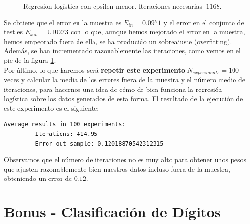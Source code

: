 \documentclass[12pt]{article}
\begin{document}
{\begin{figure}[H]
  \centering
  \qquad
  \caption{Regresión logística con epsilon menor. Iteraciones necesarias: $1168$. }
  \label{fig:myfig:3}
\end{figure}
Se obtiene que el error en la muestra es $E_{in} = 0.0971$ y el error en el conjunto de test es $E_{out} = 0.10273$ con lo que, aunque hemos mejorado el error en la muestra, hemos empeorado fuera de ella, se ha producido un sobreajuste (overfitting). Además, se han incrementado razonablemente las iteraciones, como vemos en el pie de la figura \ref{fig:myfig:3}.\\

Por último, lo que haremos será \textbf{repetir este experimento} $N_{experiments} = 100$ veces y calcular la media de los errores fuera de la muestra y el número medio de iteraciones, para hacernos una idea de cómo de bien funciona la regresión logística sobre los datos generados de esta forma. El resultado de la ejecución de este experimento es el siguiente:
\begin{lstlisting}[language=bash]
  Average results in 100 experiments:
         Iterations: 414.95
         Error out sample: 0.12018870542312315
\end{lstlisting}

Observamos que el número de iteraciones no es muy alto para obtener unos pesos que ajusten razonablemente bien nuestros datos incluso fuera de la muestra, obteniendo un error de $0.12$.

\section*{Bonus - Clasificación de Dígitos}

}
\end{document}

